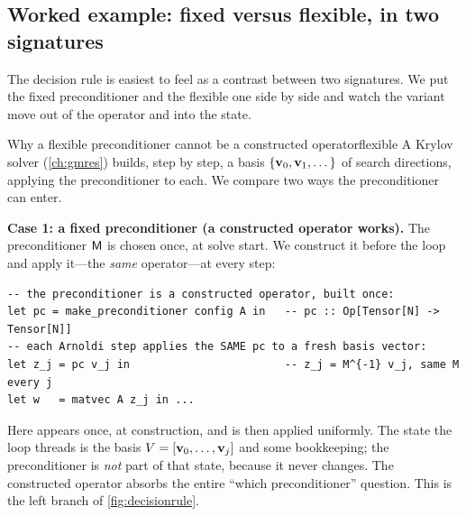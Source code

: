 \subsection{Worked example: fixed versus flexible, in two signatures}

The decision rule is easiest to feel as a contrast between two signatures. We put the
fixed preconditioner and the flexible one side by side and watch the variant move out
of the operator and into the state.

\begin{workedexample}{Why a flexible preconditioner cannot be a constructed
operator}{flexible}
A Krylov solver (\cref{ch:gmres}) builds, step by step, a basis $\{\mathbf{v}_0, \mathbf{v}_1,
\dots\}$ of search directions, applying the preconditioner to each. We compare two
ways the preconditioner can enter.

\textbf{Case 1: a fixed preconditioner (a constructed operator works).} The
preconditioner $\mathsf{M}$ is chosen once, at solve start. We construct it before the
loop and apply it---the \emph{same} operator---at every step:
\begin{lstlisting}[style=l4style]
-- the preconditioner is a constructed operator, built once:
let pc = make_preconditioner config A in   -- pc :: Op[Tensor[N] -> Tensor[N]]
-- each Arnoldi step applies the SAME pc to a fresh basis vector:
let z_j = pc v_j in                        -- z_j = M^{-1} v_j, same M every j
let w   = matvec A z_j in ...
\end{lstlisting}
Here  appears once, at construction, and is then applied uniformly. The state
the loop threads is the basis $V = [\mathbf{v}_0, \dots, \mathbf{v}_j]$ and some bookkeeping; the
preconditioner is \emph{not} part of that state, because it never changes. The
constructed operator absorbs the entire ``which preconditioner'' question. This is
the left branch of \cref{fig:decisionrule}.


\end{workedexample}
